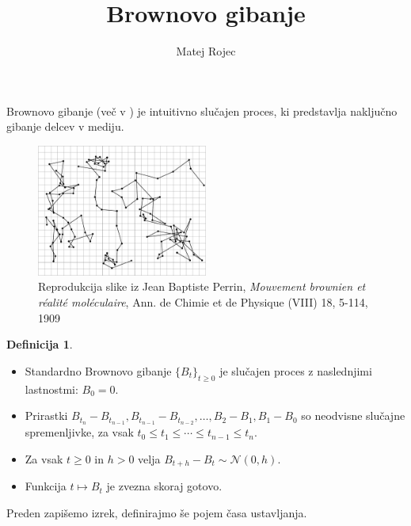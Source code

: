 \documentclass[11pt]{article}
\title{Brownovo gibanje}
\author{Matej Rojec}
\date{}
\theoremstyle{definition}
\newtheorem{definicija}{Definicija}
\theoremstyle{plain}
\begin{document}
\maketitle 

Brownovo gibanje (več v \cite{karatzas1991brownian}) je intuitivno slučajen proces, %
ki predstavlja naključno gibanje delcev v mediju.
    
\begin{figure}
    \centering
    \includegraphics[width=0.5\textwidth]{PerrinPlot2.pdf}
    \caption{Reprodukcija slike iz Jean Baptiste Perrin, \emph{Mouvement brownien et réalité moléculaire}, Ann. de Chimie et de Physique (VIII) 18, 5-114, 1909}
    \label{fig:perrin_plot}
\end{figure}

    \begin{definicija}
        \begin{itemize}
            \item Standardno Brownovo gibanje $\{B_t\}_{t \geq 0}$ je slučajen proces z naslednjimi lastnostmi: 
        $B_0 = 0$.
            \item Prirastki $B_{t_n} - B_{t_{n-1}}, B_{t_{n-1}} - B_{t_{n-2}}, \ldots, B_2 - B_1, B_1 - B_0$ so neodvisne slučajne spremenljivke, za vsak $t_0 \leq t_1 \leq \cdots \leq t_{n-1} \leq t_n$.
            \item Za vsak $t \geq 0$ in $h > 0$ velja $B_{t+h} - B_t \sim \mathcal{N}(0, h)$.
            \item Funkcija $t \mapsto B_t$ je zvezna skoraj gotovo. 
        \end{itemize}  
    \end{definicija}
    
    Preden zapišemo izrek, definirajmo še pojem časa ustavljanja.
    
\end{document}
